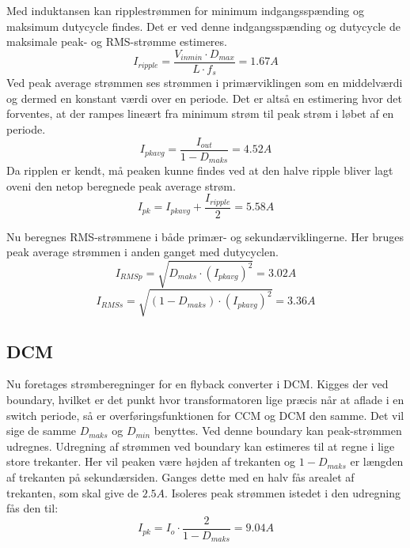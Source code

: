 \noindent Med induktansen kan ripplestrømmen for minimum indgangsspænding og maksimum dutycycle findes. Det er ved denne indgangsspænding og dutycycle de maksimale peak- og RMS-strømme estimeres. 
\begin{equation} \label{I_ripple_CCM}
I_{ripple} = \frac{V_{inmin} \cdot D_{max}}{L \cdot f_s} = 1.67A
\end{equation}
Ved peak average strømmen ses strømmen i primærviklingen som en middelværdi og dermed en konstant værdi over en periode. Det er altså en estimering hvor det forventes, at der rampes lineært fra minimum strøm til peak strøm i løbet af en periode. 
\begin{equation} \label{I_pk_avg_CCM}
I_{pkavg} = \frac{I_{out}}{1-D_{maks}} = 4.52A
\end{equation}
Da ripplen er kendt, må peaken kunne findes ved at den halve ripple bliver lagt oveni den netop beregnede peak average strøm.
\begin{equation} \label{I_pk_CCM}
I_{pk} = I_{pkavg} + \frac{I_{ripple}}{2} = 5.58A
\end{equation}

\noindent Nu beregnes RMS-strømmene i både primær- og sekundærviklingerne. Her bruges peak average strømmen i anden ganget med dutycyclen\cite{transformator-design}. 
\begin{equation} \label{I_p_RMS_CCM}
I_{RMSp} = \sqrt{D_{maks} \cdot (I_{pkavg})^2} = 3.02A
\end{equation}
\begin{equation} \label{I_s_RMS_CCM}
I_{RMSs} = \sqrt{(1-D_{maks}) \cdot (I_{pkavg})^2} = 3.36A
\end{equation}

\subsection{DCM}
Nu foretages strømberegninger for en flyback converter i DCM.
Kigges der ved boundary, hvilket er det punkt hvor transformatoren lige præcis når at aflade i en switch periode, så er overføringsfunktionen for CCM og DCM den samme. Det vil sige de samme $D_{maks}$ og $D_{min}$ benyttes. 
Ved denne boundary kan peak-strømmen udregnes. Udregning af strømmen ved boundary kan estimeres til at regne i lige store trekanter. Her vil peaken være højden af trekanten og $1-D_{maks}$ er længden af trekanten på sekundærsiden. Ganges dette med en halv fås arealet af trekanten, som skal give de $2.5A$. Isoleres peak strømmen istedet i den udregning fås den til:
\begin{equation} \label{DCM_peak_current}
I_{pk} = I_o \cdot \frac{2}{1-D_{maks}} = 9.04A
\end{equation}

